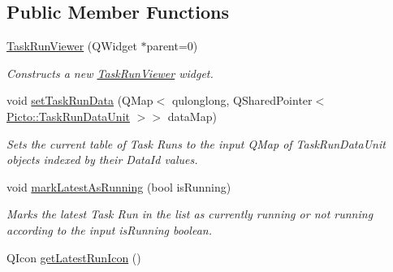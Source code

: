 \subsection*{Public Member Functions}
\begin{DoxyCompactItemize}
\item 
\hypertarget{class_task_run_viewer_a6c8c386216ea3a45ebac5dfb6a28623a}{\hyperlink{class_task_run_viewer_a6c8c386216ea3a45ebac5dfb6a28623a}{Task\-Run\-Viewer} (Q\-Widget $\ast$parent=0)}\label{class_task_run_viewer_a6c8c386216ea3a45ebac5dfb6a28623a}

\begin{DoxyCompactList}\small\item\em Constructs a new \hyperlink{class_task_run_viewer}{Task\-Run\-Viewer} widget. \end{DoxyCompactList}\item 
\hypertarget{class_task_run_viewer_ac2204abac526043c4262951ca1853838}{void \hyperlink{class_task_run_viewer_ac2204abac526043c4262951ca1853838}{set\-Task\-Run\-Data} (Q\-Map$<$ qulonglong, Q\-Shared\-Pointer$<$ \hyperlink{class_picto_1_1_task_run_data_unit}{Picto\-::\-Task\-Run\-Data\-Unit} $>$$>$ data\-Map)}\label{class_task_run_viewer_ac2204abac526043c4262951ca1853838}

\begin{DoxyCompactList}\small\item\em Sets the current table of Task Runs to the input Q\-Map of Task\-Run\-Data\-Unit objects indexed by their Data\-Id values. \end{DoxyCompactList}\item 
\hypertarget{class_task_run_viewer_a2a166ec4c72e6c94f130a88448d8158a}{void \hyperlink{class_task_run_viewer_a2a166ec4c72e6c94f130a88448d8158a}{mark\-Latest\-As\-Running} (bool is\-Running)}\label{class_task_run_viewer_a2a166ec4c72e6c94f130a88448d8158a}

\begin{DoxyCompactList}\small\item\em Marks the latest Task Run in the list as currently running or not running according to the input is\-Running boolean. \end{DoxyCompactList}\item 
\hypertarget{class_task_run_viewer_af817e69ef981a63d4c8594613fc13a05}{Q\-Icon \hyperlink{class_task_run_viewer_af817e69ef981a63d4c8594613fc13a05}{get\-Latest\-Run\-Icon} ()}\label{class_task_run_viewer_af817e69ef981a63d4c8594613fc13a05}


\end{DoxyCompactItemize}
